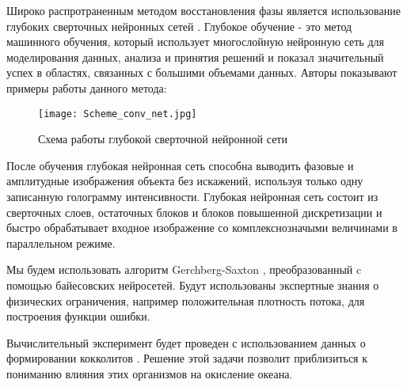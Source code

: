 \documentclass[12pt, twoside]{article}
\begin{document}
Широко распротраненным методом восстановления фазы является использование глубоких сверточных нейронных сетей \cite{rivenson2018phase}. Глубокое обучение - это метод машинного обучения, который использует многослойную нейронную сеть для моделирования данных, анализа и принятия решений и показал значительный успех в областях, связанных с большими объемами данных. Авторы \cite{rivenson2018phase} показывают примеры работы данного метода:
\newpage

\begin{figure}[h!]
\centering
\texttt{[image: Scheme\_conv\_net.jpg]}
\caption{Схема работы глубокой сверточной нейронной сети}
\end{figure}


После обучения глубокая нейронная сеть способна выводить фазовые и амплитудные изображения объекта без искажений, используя только одну записанную голограмму интенсивности. Глубокая нейронная сеть состоит из сверточных слоев, остаточных блоков и блоков повышенной дискретизации и быстро обрабатывает входное изображение со комплекснозначыми величинами в параллельном  режиме.


Мы будем использовать алгоритм Gerchberg-Saxton \cite{jo2018quantitative}, преобразованный c помощью байесовских нейросетей. Будут использованы экспертные знания о физических ограничения, например положительная плотность потока, для построения функции ошибки.

Вычислительный эксперимент будет проведен с использованием данных о формировании кокколитов \cite{beuvier2019x}. Решение этой задачи позволит приблизиться к пониманию влияния этих организмов на окисление океана.



\end{document}
